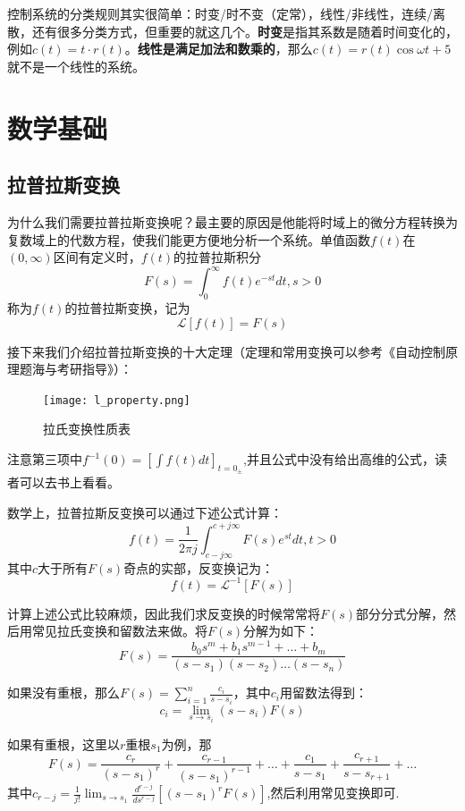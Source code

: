 \documentclass[lang=cn,10pt]{elegantbook}
\begin{document}
控制系统的分类规则其实很简单：时变/时不变（定常），线性/非线性，连续/离散，还有很多分类方式，但重要的就这几个。\textbf{时变}是指其系数是随着时间变化的，例如$c(t)=t\cdot{r(t)}$。\textbf{线性是满足加法和数乘的}，那么$c(t)=r(t)\cos\omega t+5$就不是一个线性的系统。

\section{数学基础}

\subsection{拉普拉斯变换}

为什么我们需要拉普拉斯变换呢？最主要的原因是他能将时域上的微分方程转换为复数域上的代数方程，使我们能更方便地分析一个系统。单值函数$f(t)$在$(0,\infty)$区间有定义时，$f(t)$的拉普拉斯积分
\begin{equation}
   F(s)=\int_0^{\infty} f(t)e^{-st}dt, s>0
\end{equation}
称为$f(t)$的拉普拉斯变换，记为
\[\mathscr{L}[f(t)] = F(s)\]

接下来我们介绍拉普拉斯变换的十大定理（定理和常用变换可以参考《自动控制原理题海与考研指导》）：
\begin{figure}[htbp]
  \centering
  \texttt{[image: l\_property.png]}
  \caption{拉氏变换性质表} \label{fig:l_property}
\end{figure}

注意第三项中$f^{-1}(0)=[{\int f(t) dt}]_{t=0_{\pm}}$,并且公式中没有给出高维的公式，读者可以去书上看看。

数学上，拉普拉斯反变换可以通过下述公式计算：
\begin{equation}
   f(t) = \frac{1}{2\pi j}\int_{c-j\infty}^{c+j\infty} F(s)e^{st}dt, t>0
\end{equation}
其中$c$大于所有$F(s)$奇点的实部，反变换记为：
\[f(t)={\mathscr{L}}^{-1}[F(s)]\]


计算上述公式比较麻烦，因此我们求反变换的时候常常将$F(s)$部分分式分解，然后用常见拉氏变换和留数法来做。将$F(s)$分解为如下：
\[F(s)= \frac{{b_0 s^m}+{b_1 s^{m-1}}+\dots+{b_m}}{(s-s_1)(s-s_2)\dots(s-s_n)}\]

如果没有重根，那么$F(s)=\sum\limits_{i=1}^n \frac{c_i}{s-s_i}$，其中$c_i$用留数法得到：
\begin{equation}
   c_i=\lim_{s \to s_i}(s-s_i)F(s)
\end{equation}

如果有重根，这里以$r$重根$s_1$为例，那
\[F(s)=\frac{c_r}{(s-s_1)^r} + \frac{c_{r-1}}{(s-s_1)^{r-1}}+\dots + \frac{c_1}{s-s_1}+\frac{c_{r+1}}{s-s_{r+1}}+\dots\]
其中$\displaystyle{c_{r-j}=\frac{1}{j!} \lim_{s \to s_1} \frac{d^{r-j}}{ds^{r-j}}[(s-s_1)^r F(s)]}$,然后利用常见变换即可.
\end{document}
